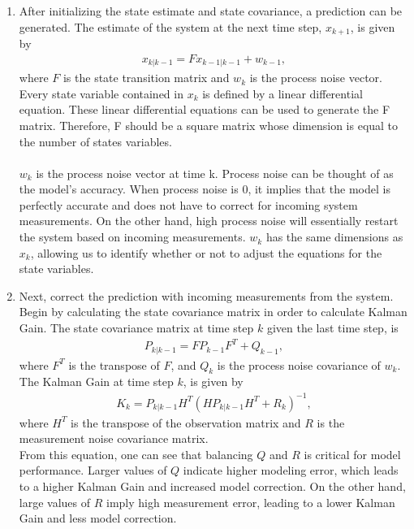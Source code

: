 \begin{enumerate}
 \item After initializing the state estimate and state covariance, a prediction can be generated. The estimate of the system at the next time step, $x_{k+1}$,  is given by
  \begin{align*}
      x_{k|k-1} = F x_{k-1|k-1} + w_{k-1} ,
  \end{align*} 
  where $F$ is the state transition matrix and $w_k$ is the process noise vector. Every state variable contained in $x_k$ is defined by a linear differential equation. These linear differential equations can be used to generate the F matrix. Therefore, F should be a square matrix whose dimension is equal to the number of states variables. \\ \\
  $w_k$ is the process noise vector at time k. Process noise can be thought of as the model's accuracy. When process noise is 0, it implies that the model is perfectly accurate and does not have to correct for incoming system measurements. On the other hand, high process noise will essentially restart the system based on incoming measurements. $w_k$ has the same dimensions as $x_k$, allowing us to identify whether or not to adjust the equations for the state variables. \\
  
  \item Next, correct the prediction with incoming measurements from the system. Begin by calculating the state covariance matrix in order to calculate Kalman Gain. The state covariance matrix at time step $k$ given the last time step, is 
    \begin{align*} 
        P_{k | k -1} = F P_{k - 1} F^T + Q_{k-1}, 
    \end{align*}
    where $F^T$ is the transpose of $F$, and $Q_{k}$ is the process noise covariance of $w_k$.
    The Kalman Gain at time step $k$, is given by
    \begin{align*} 
        K_k = P_{k | k - 1} H^T (H P_{k | k - 1} H^T + R_k)^{-1},
    \end{align*}
      where $H^T$ is the transpose of the observation matrix and $R$ is the measurement noise covariance matrix. \\ 

     \noindent From this equation, one can see that balancing $Q$ and $R$ is critical for model performance. Larger values of $Q$ indicate higher modeling error, which leads to a higher Kalman Gain and increased model correction. On the other hand, large values of $R$ imply high measurement error, leading to a lower Kalman Gain and less model correction. \\ 
     

\end{enumerate}
